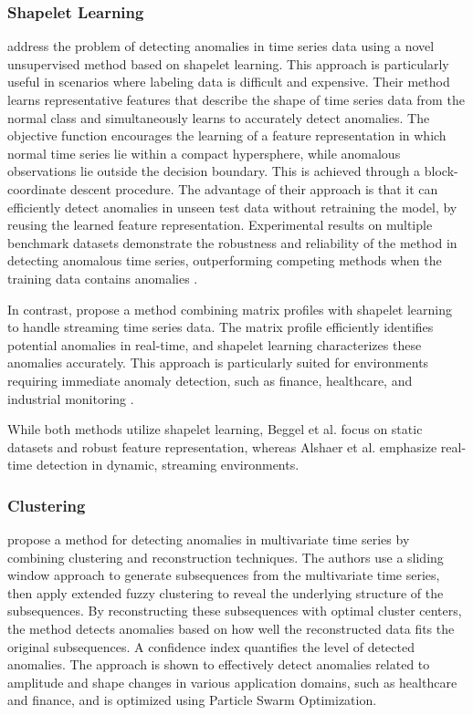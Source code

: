 \subsubsection{Shapelet Learning}
 address the problem of detecting anomalies in time series data using a novel unsupervised method based on shapelet learning. This approach is particularly useful in scenarios where labeling data is difficult and expensive.
Their method learns representative features that describe the shape of time series data from the normal class and simultaneously learns to accurately detect anomalies. The objective function encourages the learning of a feature representation in which normal time series lie within a compact hypersphere, while anomalous observations lie outside the decision boundary. This is achieved through a block-coordinate descent procedure.
The advantage of their approach is that it can efficiently detect anomalies in unseen test data without retraining the model, by reusing the learned feature representation. Experimental results on multiple benchmark datasets demonstrate the robustness and reliability of the method in detecting anomalous time series, outperforming competing methods when the training data contains anomalies .

In contrast,  propose a method combining matrix profiles with shapelet learning to handle streaming time series data. The matrix profile efficiently identifies potential anomalies in real-time, and shapelet learning characterizes these anomalies accurately. This approach is particularly suited for environments requiring immediate anomaly detection, such as finance, healthcare, and industrial monitoring .

While both methods utilize shapelet learning, Beggel et al. focus on static datasets and robust feature representation, whereas Alshaer et al. emphasize real-time detection in dynamic, streaming environments.

\subsubsection{Clustering}
 propose a method for detecting anomalies in multivariate time series by combining clustering and reconstruction techniques. The authors use a sliding window approach to generate subsequences from the multivariate time series, then apply extended fuzzy clustering to reveal the underlying structure of the subsequences. By reconstructing these subsequences with optimal cluster centers, the method detects anomalies based on how well the reconstructed data fits the original subsequences. A confidence index quantifies the level of detected anomalies. The approach is shown to effectively detect anomalies related to amplitude and shape changes in various application domains, such as healthcare and finance, and is optimized using Particle Swarm Optimization.


